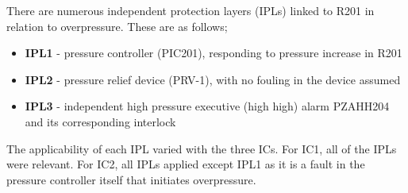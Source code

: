 
 
 There are numerous  independent protection layers (IPLs) linked to R201 in relation to overpressure. These are as follows;
 
 \begin{itemize}
\item  \textbf{IPL1} - pressure controller (PIC201), responding to pressure increase in R201
\item  \textbf{IPL2} - pressure relief device (PRV-1), with no fouling in the device assumed 
\item  \textbf{IPL3} - independent high pressure executive (high high) alarm PZAHH204 and its corresponding interlock
 \end{itemize}



The applicability of each IPL varied with the three ICs. For IC1, all of the IPLs were relevant. For IC2, all IPLs applied except IPL1 as it is a fault in the pressure controller itself that initiates overpressure. 







 